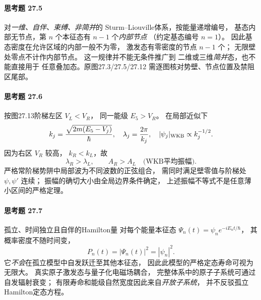 \paragraph{思考题 27.5}
对\emph{一维、自伴、束缚、非简并}的
Sturm--Liouville体系，按能量递增编号，
基态内部无节点，第 \(n\) 个本征态有
\(\boxed{n-1}\) 个\emph{内部节点}
（约定基态编号 \(n=1\)）。
因此基态密度在允许区域的内部一般不为零，
激发态有零密度的节点 \(n-1\) 个；
无限壁处零点不计作内部节点。
这一规律并不能无条件推广到
二维或三维\emph{简并}态，也不能直接用于
任意叠加态。原图27.3/27.5/27.12
需逐图核对势壁、节点位置及禁阻区尾部。

\paragraph{思考题 27.6}
按图27.13阶梯左区 \(V_L<V_R\)，
同一能级 \(E_5>V_R\)。
在局部近似下
\[
k_j=\frac{\sqrt{2m(E_5-V_j)}}{\hbar},
\quad \lambda_j=\frac{2\pi}{k_j},\quad
|\psi_j|_{\rm WKB}\propto k_j^{-1/2}.
\]
因为右区 \(V_R\) 较高，
\(k_R<k_L\)，故
\[
\boxed{\lambda_R>\lambda_L},\qquad
\boxed{A_R>A_L\quad\text{(WKB平均振幅)}}.
\]
严格常阶梯势阱中局部波为不同波数的正弦组合，
需同时满足壁零值与阶梯处 \(\psi,\psi'\) 连续；
振幅的确切大小由全局边界条件确定，
上述振幅不等式不是任意薄小区间的严格定理。

\paragraph{思考题 27.7}
孤立、时间独立且自伴的Hamilton量
对每个能量本征态
\(\Psi_n(t)=\psi_ne^{-iE_nt/\hbar}\)，
其概率密度不随时间变，
\[
\boxed{P_n(t)=|\Psi_n(t)|^2=|\psi_n|^2}.
\]
它\emph{不会}在孤立模型中自发跃迁至其他本征态，
因此此模型的严格定态寿命可视为无限大。
真实原子激发态与量子化电磁场耦合，
完整体系中的原子子系统可通过自发辐射衰变；
有限寿命和能级自然宽度因此来自\emph{开放子系统}，
并不反驳孤立Hamilton定态方程。
